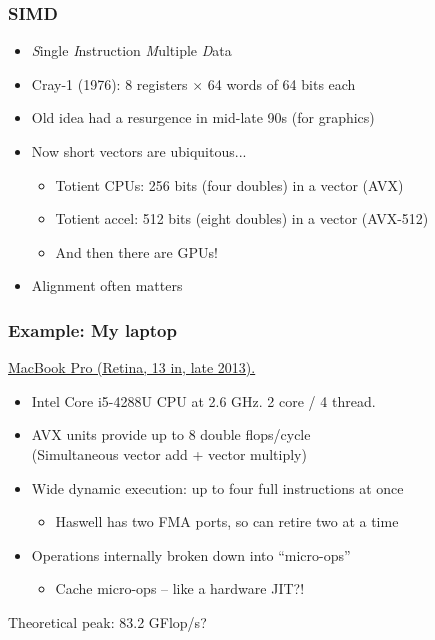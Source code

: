 \documentclass{beamer}
\begin{document}
\begin{frame}
  \frametitle{SIMD}

  \begin{itemize}
  \item {\em S}ingle {\em I}nstruction {\em M}ultiple {\em D}ata
  \item Cray-1 (1976): 8 registers $\times$ 64 words of 64 bits each
  \item Old idea had a resurgence in mid-late 90s (for graphics)
  \item Now short vectors are ubiquitous...
    \begin{itemize}
    \item Totient CPUs: 256 bits (four doubles) in a vector (AVX)
    \item Totient accel: 512 bits (eight doubles) in a vector (AVX-512)
    \item And then there are GPUs!
    \end{itemize}
  \item Alignment often matters
  \end{itemize}
\end{frame}


\begin{frame}
  \frametitle{Example: My laptop}

  \href{http://ark.intel.com/products/75991/Intel-Core-i5-4288U-Processor-3M-Cache-up-to-3_10-GHz}{MacBook Pro (Retina, 13 in, late 2013).}
  \begin{itemize}
  \item Intel Core i5-4288U CPU at 2.6 GHz.  2 core / 4 thread.
  \item AVX units provide up to 8 double flops/cycle \\
        (Simultaneous vector add + vector multiply)
  \item Wide dynamic execution: up to four full instructions at once
    \begin{itemize}
    \item Haswell has two FMA ports, so can retire two at a time
    \end{itemize}
  \item Operations internally broken down into ``micro-ops''
    \begin{itemize}
    \item Cache micro-ops -- like a hardware JIT?!
    \end{itemize}
  \end{itemize}
  Theoretical peak: 83.2 GFlop/s?

\end{frame}
\end{document}

